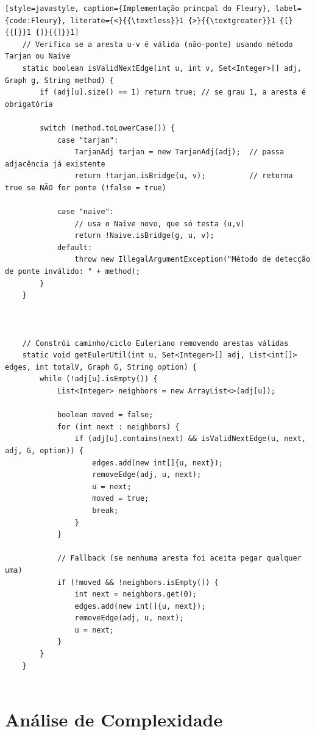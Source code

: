 \documentclass[12pt]{article}
\begin{document}
\begin{lstlisting}[style=javastyle, caption={Implementação princpal do Fleury}, label={code:Fleury}, literate={<}{{\textless}}1 {>}{{\textgreater}}1 {[}{{[}}1 {]}{{]}}1]
    // Verifica se a aresta u-v é válida (não-ponte) usando método Tarjan ou Naive
    static boolean isValidNextEdge(int u, int v, Set<Integer>[] adj, Graph g, String method) {
        if (adj[u].size() == 1) return true; // se grau 1, a aresta é obrigatória

        switch (method.toLowerCase()) {
            case "tarjan":
                TarjanAdj tarjan = new TarjanAdj(adj);  // passa adjacência já existente
                return !tarjan.isBridge(u, v);          // retorna true se NÃO for ponte (!false = true)

            case "naive":
                // usa o Naive novo, que só testa (u,v)
                return !Naive.isBridge(g, u, v);
            default:
                throw new IllegalArgumentException("Método de detecção de ponte inválido: " + method);
        }
    }



    // Constrói caminho/ciclo Euleriano removendo arestas válidas
    static void getEulerUtil(int u, Set<Integer>[] adj, List<int[]> edges, int totalV, Graph G, String option) {
        while (!adj[u].isEmpty()) {
            List<Integer> neighbors = new ArrayList<>(adj[u]);

            boolean moved = false;
            for (int next : neighbors) {
                if (adj[u].contains(next) && isValidNextEdge(u, next, adj, G, option)) {
                    edges.add(new int[]{u, next});
                    removeEdge(adj, u, next);
                    u = next;
                    moved = true;
                    break;
                }
            }

            // Fallback (se nenhuma aresta foi aceita pegar qualquer uma)
            if (!moved && !neighbors.isEmpty()) {
                int next = neighbors.get(0);
                edges.add(new int[]{u, next});
                removeEdge(adj, u, next);
                u = next;
            }
        }
    }


\end{lstlisting}

\section{Análise de Complexidade}
\end{document}
